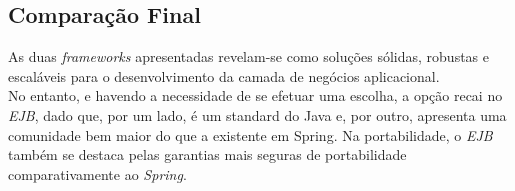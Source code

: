 \subsection{Comparação Final}

As duas \textit{frameworks} apresentadas revelam-se como soluções sólidas, robustas e escaláveis para o desenvolvimento da camada de negócios aplicacional.\\

No entanto, e havendo a necessidade de se efetuar uma escolha, a opção recai no \textit{EJB}, dado que, por um lado, é um standard do Java e, por outro, apresenta uma comunidade bem maior do que a existente em Spring.
Na portabilidade, o \textit{EJB} também se destaca pelas garantias mais seguras de portabilidade comparativamente ao \textit{Spring}.
